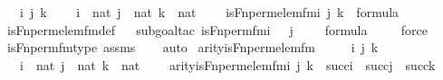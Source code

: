 \begin{isabellebody}
\ \ \ i\ j\ k\ \isanewline
\ \ \ {\isachardoublequoteopen}i\ {\isasymin}\ nat{\isachardoublequoteclose}\ {\isachardoublequoteopen}j\ {\isasymin}\ nat{\isachardoublequoteclose}\ {\isachardoublequoteopen}k\ {\isasymin}\ nat{\isachardoublequoteclose}\ \isanewline
\ \ \ {\isachardoublequoteopen}is{\isacharunderscore}{\kern0pt}Fn{\isacharunderscore}{\kern0pt}perm{\isacharprime}{\kern0pt}{\isacharunderscore}{\kern0pt}elem{\isacharunderscore}{\kern0pt}fm{\isacharparenleft}{\kern0pt}i{\isacharcomma}{\kern0pt}\ j{\isacharcomma}{\kern0pt}\ k{\isacharparenright}{\kern0pt}\ {\isasymin}\ formula{\isachardoublequoteclose}\ \isanewline
%
\isadelimproof
\ \ %
\endisadelimproof
%
\isatagproof
{}\isamarkupfalse%
\ is{\isacharunderscore}{\kern0pt}Fn{\isacharunderscore}{\kern0pt}perm{\isacharprime}{\kern0pt}{\isacharunderscore}{\kern0pt}elem{\isacharunderscore}{\kern0pt}fm{\isacharunderscore}{\kern0pt}def\isanewline
\ \ \isamarkupfalse%
{\isacharparenleft}{\kern0pt}subgoal{\isacharunderscore}{\kern0pt}tac\ {\isachardoublequoteopen}is{\isacharunderscore}{\kern0pt}Fn{\isacharunderscore}{\kern0pt}perm{\isacharunderscore}{\kern0pt}fm{\isacharparenleft}{\kern0pt}i\ {\isacharhash}{\kern0pt}{\isacharplus}{\kern0pt}\ {}{\isacharcomma}{\kern0pt}\ j\ {\isacharhash}{\kern0pt}{\isacharplus}{\kern0pt}\ {}{\isacharcomma}{\kern0pt}\ {}{\isacharparenright}{\kern0pt}\ {\isasymin}\ formula{\isachardoublequoteclose}{\isacharparenright}{\kern0pt}\isanewline
\ \ \ \isamarkupfalse%
\ force\ \isanewline
\ \ \isamarkupfalse%
\ is{\isacharunderscore}{\kern0pt}Fn{\isacharunderscore}{\kern0pt}perm{\isacharunderscore}{\kern0pt}fm{\isacharunderscore}{\kern0pt}type\ assms\isanewline
\ \ \isamarkupfalse%
\ auto%
\endisatagproof
{\isafoldproof}%
%
\isadelimproof
\isanewline
%
\endisadelimproof
\isanewline
{}\isamarkupfalse%
\ arity{\isacharunderscore}{\kern0pt}is{\isacharunderscore}{\kern0pt}Fn{\isacharunderscore}{\kern0pt}perm{\isacharprime}{\kern0pt}{\isacharunderscore}{\kern0pt}elem{\isacharunderscore}{\kern0pt}fm\ {\isacharcolon}{\kern0pt}\ \isanewline
\ \ \ i\ j\ k\ \isanewline
\ \ \ {\isachardoublequoteopen}i\ {\isasymin}\ nat{\isachardoublequoteclose}\ {\isachardoublequoteopen}j\ {\isasymin}\ nat{\isachardoublequoteclose}\ {\isachardoublequoteopen}k\ {\isasymin}\ nat{\isachardoublequoteclose}\ \isanewline
\ \ \ {\isachardoublequoteopen}arity{\isacharparenleft}{\kern0pt}is{\isacharunderscore}{\kern0pt}Fn{\isacharunderscore}{\kern0pt}perm{\isacharprime}{\kern0pt}{\isacharunderscore}{\kern0pt}elem{\isacharunderscore}{\kern0pt}fm{\isacharparenleft}{\kern0pt}i{\isacharcomma}{\kern0pt}\ j{\isacharcomma}{\kern0pt}\ k{\isacharparenright}{\kern0pt}{\isacharparenright}{\kern0pt}\ {\isasymle}\ succ{\isacharparenleft}{\kern0pt}i{\isacharparenright}{\kern0pt}\ {\isasymunion}\ succ{\isacharparenleft}{\kern0pt}j{\isacharparenright}{\kern0pt}\ {\isasymunion}\ succ{\isacharparenleft}{\kern0pt}k{\isacharparenright}{\kern0pt}{\isachardoublequoteclose}\isanewline

\end{isabellebody}
